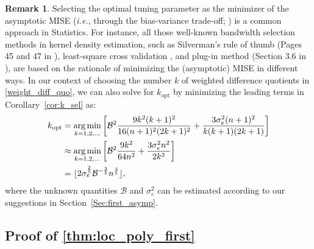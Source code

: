 \documentclass{uwstat572}
\theoremstyle{definition}
\newtheorem{Remark}{Remark}
\DeclareMathOperator*{\argmin}{arg\,min}
\DeclarePairedDelimiter\floor{\lfloor}{\rfloor}
\theoremstyle{theorem}
\begin{document}
\begin{Remark}
Selecting the optimal tuning parameter as the minimizer of the asymptotic MISE (\emph{i.e.}, through the bias-variance trade-off; \citealt{wasserman2006all}) is a common approach in Statistics. For instance, all those well-known bandwidth selection methods in kernel density estimation, such as Silverman's rule of thumb (Pages 45 and 47 in \citealt{silverman1986density}), least-square cross validation \citep{hall1983large}, and plug-in method (Section 3.6 in \citealt{wand1994kernel}), are based on the rationale of minimizing the (asymptotic) MISE in different ways. In our context of choosing the number $k$ of weighted difference quotients in \eqref{weight_diff_quo}, we can also solve for $k_{\text{opt}}$ by minimizing the leading terms in Corollary~\ref{cor:k_sel} as:
\begin{align*}
k_{\text{opt}} &= \argmin_{k=1,2,...} \left[\mathcal{B}^2\frac{9k^2(k+1)^2}{16(n+1)^2(2k+1)^2} + \frac{3\sigma_e^2 (n+1)^2}{k(k+1)(2k+1)} \right] \\
&\approx \argmin_{k=1,2,...} \left[\mathcal{B}^2\frac{9k^2}{64n^2} + \frac{3\sigma_e^2 n^2}{2k^3} \right]\\
&= \floor{2 \sigma_e^{\frac{2}{5}} \mathcal{B}^{-\frac{2}{5}} n^{\frac{4}{5}}},
\end{align*}
where the unknown quantities $\mathcal{B}$ and $\sigma_e^2$ can be estimated according to our suggestions in Section~\ref{Sec:first_asymp}.
\end{Remark}

\subsection{Proof of \autoref{thm:loc_poly_first}}
\label{App:proof_thm3}
\end{document}
